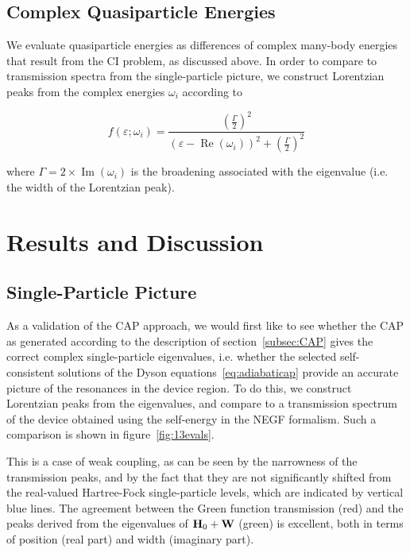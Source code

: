 \subsection{Complex Quasiparticle Energies}

We evaluate quasiparticle energies as differences of complex many-body energies
that result from the \ac{CI} problem, as discussed above. In order to compare
to transmission spectra from the single-particle picture, we construct
Lorentzian peaks from the complex energies $\omega_i$ according to

\begin{equation}
	f(\varepsilon;\omega_i)
	= \frac{\left( \frac{\Gamma}{2} \right)^2}
	       {(\varepsilon - \operatorname{Re}(\omega_i))^2
	       + \left( \frac{\Gamma}{2} \right)^2}
	\label{eq:lobro}
\end{equation}

where $\Gamma = 2 \times \operatorname{Im}(\omega_i)$ is the broadening
associated with the eigenvalue (i.e. the width of the Lorentzian peak).

\section{Results and Discussion}
\label{sec:results}

\subsection{Single-Particle Picture}
\label{subsec:SingleParticle}

As a validation of the \ac{CAP} approach, we would first like to see whether
the \ac{CAP} as generated according to the description of
section~\ref{subsec:CAP} gives the correct complex single-particle eigenvalues,
i.e. whether the selected self-consistent solutions of the Dyson
equations~\ref{eq:adiabaticap} provide an accurate picture of the resonances
in the device region. To do this, we construct Lorentzian peaks from the
eigenvalues, and compare to a transmission spectrum of the device obtained
using the self-energy in the \ac{NEGF} formalism. Such a comparison is shown in
figure~\ref{fig:13evals}.

This is a case of weak coupling, as can be seen by the narrowness of the
transmission peaks, and by the fact that they are not significantly shifted
from the real-valued Hartree-Fock single-particle levels, which are indicated
by vertical blue lines. The agreement between the Green function transmission
(red) and the peaks derived from the eigenvalues of $\mathbf{H}_0 + \mathbf{W}$ (green)
is excellent, both in terms of position (real part) and width (imaginary part).

